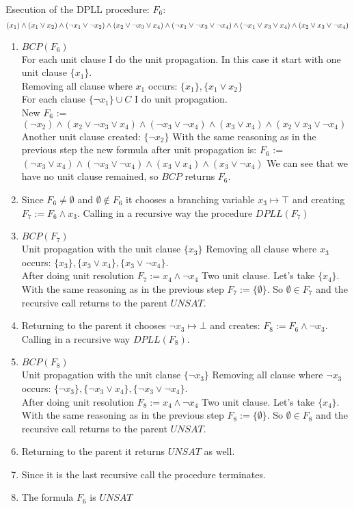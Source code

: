 \documentclass[addpoints,12pt]{exam}
\begin{document}
\begin{questions}
Esecution of the DPLL procedure:
$F_6$:
\[(x_1) \land (x_1 \lor x_2) \land (\neg x_1 \lor \neg x_2) \land (x_2 \lor \neg x_3 \lor x_4) \\
\land (\neg x_1 \lor \neg x_3 \lor \neg x_4) \land (\neg x_1 \lor x_3 \lor x_4) \land (x_2 \lor x_3 \lor \neg x_4)\]
\begin{enumerate}
    \item $BCP(F_6)$ \\
        For each unit clause I do the unit propagation.
        In this case it start with one unit clause $\{x_1\}$. \\
        Removing all clause where $x_1$ occurs: $\{x_1\},\{x_1 \lor x_2\}$\\
        For each clause $\{\neg x_1\} \cup C$ I do unit propagation. \\
        New $F_6$ := $(\neg x_2)\land (x_2 \lor \neg x_3 \lor x_4)
        \land (\neg x_3 \lor \neg x_4) \land (x_3 \lor x_4) \land (x_2 \lor x_3 \lor \neg x_4)$
        Another unit clause created: $\{\neg x_2\}$
        With the same reasoning as in the previous step the new formula after unit propagation is:
        $F_6$ := $(\neg x_3 \lor x_4)
        \land (\neg x_3 \lor \neg x_4) \land (x_3 \lor x_4) \land (x_3 \lor \neg x_4)$
        We can see that we have no unit clause remained, so $BCP$ returns $F_6$.
    \item Since $F_6 \neq \emptyset$ and $\emptyset \notin F_6$ it chooses a branching variable $x_3 \mapsto \top$ and creating $F_7:=F_6 \land x_3$.
    Calling in a recursive way the procedure $DPLL(F_7)$\\
    \item $BCP(F_7)$ \\
    Unit propagation with the unit clause $\{x_3\}$
    Removing all clause where $x_3$ occurs: $\{x_3\},\{x_3 \lor x_4\},\{x_3 \lor \neg x_4\}$.\\
    After doing unit resolution $F_7:= x_4 \land \neg x_4$
    Two unit clause. Let's take $\{x_4\}$.
    With the same reasoning as in the previous step $F_7:=\{\emptyset\}$.
    So $\emptyset \in F_7$ and the recursive call returns to the parent $UNSAT$.
    \item Returning to the parent it chooses $\neg x_3\mapsto \bot$ and creates: $F_8:=F_6 \land \neg x_3$. Calling in a recursive way $DPLL(F_8).$
    \item $BCP(F_8)$ \\
    Unit propagation with the unit clause $\{\neg x_3\}$
    Removing all clause where $\neg x_3$ occurs: $\{\neg x_3\},\{\neg x_3 \lor x_4\},\{\neg x_3 \lor \neg x_4\}$.\\
    After doing unit resolution $F_8:= x_4 \land \neg x_4$
    Two unit clause. Let's take $\{x_4\}$.
    With the same reasoning as in the previous step $F_8:=\{\emptyset\}$.
    So $\emptyset \in F_8$ and the recursive call returns to the parent $UNSAT$.
    \item Returning to the parent it returns $UNSAT$ as well.
    \item Since it is the last recursive call the procedure terminates.
    \item The formula $F_6$ is $UNSAT$
\end{enumerate}


\end{questions}
\end{document}
